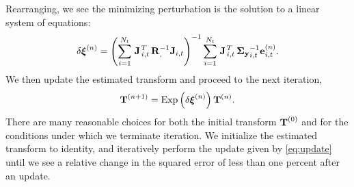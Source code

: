 Rearranging, we see the minimizing perturbation is the solution to a
linear system of equations:
\begin{equation}
  \delta\boldsymbol{\mathbf{\xi}}^{(n)} = 
  \left( \sum_{i=1}^{N_t} \left.{\boldsymbol{\mathbf{J}}}\right.^T_{i,t}
  \boldsymbol{\mathbf{R}}_{,}^{-1} \boldsymbol{\mathbf{J}}_{i,t} \right)^{-1}
  \sum_{i=1}^{N_t} \left.{\boldsymbol{\mathbf{J}}}\right.^T_{i,t}
  \boldsymbol{\mathbf{\Sigma_y}}_{i,t}^{-1} \boldsymbol{\mathbf{e}}_{i,t}^{(n)}. 
\label{eq:least-squares-iteration}
\end{equation}
We then update the estimated transform and proceed to the next iteration,
\begin{equation}
  \boldsymbol{\mathbf{T}}^{(n+1)} = \mathrm{Exp}\left({\delta\boldsymbol{\mathbf{\xi}}^{(n)}}\right) \boldsymbol{\mathbf{T}}^{(n)}. \label{eq:update}
\end{equation}
There are many reasonable choices for both the initial transform
$\boldsymbol{\mathbf{T}}^{(0)}$ and for the conditions under which we terminate
iteration. We initialize the estimated transform to identity, and iteratively
perform the update given by \cref{eq:update} until we see a relative change in
the squared error of less than one percent after an update. 

